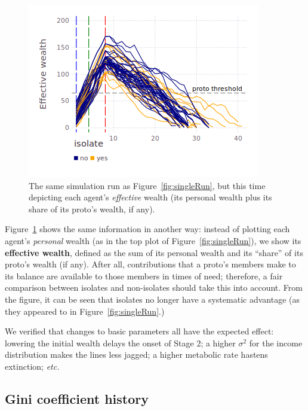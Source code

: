 \begin{figure}[ht]
\centering
\includegraphics[width=\columnwidth]{figures/sampleEffectiveHistory.png}
\caption{The same simulation run as Figure~\ref{fig:singleRun}, but this time
depicting each agent's \textit{effective} wealth (its personal wealth plus its
share of its proto's wealth, if any).}
\label{fig:effectiveWealthSingleRun}
\end{figure}

Figure~\ref{fig:effectiveWealthSingleRun} shows the same information in another
way: instead of plotting each agent's \textit{personal} wealth (as in the top
plot of Figure~\ref{fig:singleRun}), we show its \textbf{effective wealth},
defined as the sum of its personal wealth and its ``share'' of its proto's
wealth (if any). After all, contributions that a proto's members make to its
balance are available to those members in times of need; therefore, a fair
comparison between isolates and non-isolates should take this into account.
From the figure, it can be seen that isolates no longer have a systematic
advantage (as they appeared to in Figure~\ref{fig:singleRun}.)

We verified that changes to basic parameters all have the expected effect:
lowering the initial wealth delays the onset of Stage 2; a higher $\sigma^2$
for the income distribution makes the lines less jagged; a higher metabolic
rate hastens extinction; \textit{etc.}

\subsection{Gini coefficient history}


